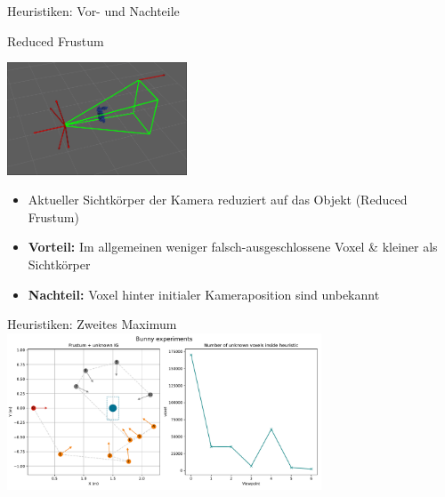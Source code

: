 \documentclass[aspectratio=169]{beamer}
\begin{document}
\begin{frame}{Heuristiken: Vor- und Nachteile}
	\begin{block}{Reduced Frustum}
		\begin{center}
			\includegraphics[width=0.4\textwidth]{Graphics/reduced_frustum.png}
		\end{center}
		\begin{itemize}
			\item Aktueller Sichtkörper der Kamera reduziert auf das Objekt (Reduced Frustum)
			\item \textbf{Vorteil:} Im allgemeinen weniger falsch-ausgeschlossene Voxel \& kleiner als Sichtkörper
			\item \textbf{Nachteil:} Voxel hinter initialer Kameraposition sind unbekannt
		\end{itemize}
	\end{block}
\end{frame}

\begin{frame}{Heuristiken: Zweites Maximum}
	\center
	\includegraphics[width=0.7\textwidth]{Graphics/bunny_views_unknown_voxels.pdf}
\end{frame}
\end{document}
